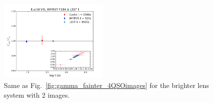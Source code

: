 \documentclass[a4paper,11pt]{article}
\begin{document}
\begin{figure}
\begin{center}
\includegraphics[width=0.48\textwidth]{figures/gamma_0330_2QSOimages_E_W_L.png}
\end{center}
\caption{Same as Fig.~\ref{fig:gamma_fainter_4QSOimages} for the brighter lens system with 2 images.
\label{fig:gamma_brighter_2QSOimages}}
\end{figure}
\end{document}
